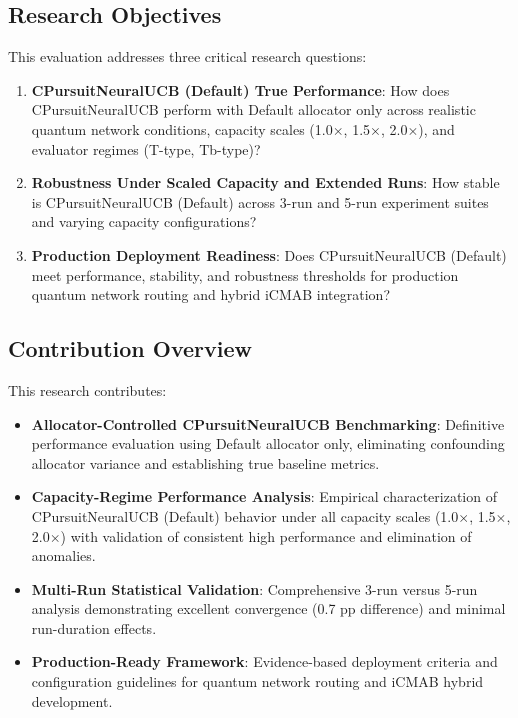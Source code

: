 \documentclass[12pt,a4paper]{article}
\begin{document}
\subsection{Research Objectives}

This evaluation addresses three critical research questions:

\begin{enumerate}
    \item \textbf{CPursuitNeuralUCB (Default) True Performance}: How does CPursuitNeuralUCB perform with Default allocator only across realistic quantum network conditions, capacity scales (1.0$\times$, 1.5$\times$, 2.0$\times$), and evaluator regimes (T-type, Tb-type)?
    
    \item \textbf{Robustness Under Scaled Capacity and Extended Runs}: How stable is CPursuitNeuralUCB (Default) across 3-run and 5-run experiment suites and varying capacity configurations?
    
    \item \textbf{Production Deployment Readiness}: Does CPursuitNeuralUCB (Default) meet performance, stability, and robustness thresholds for production quantum network routing and hybrid iCMAB integration?
\end{enumerate}

\subsection{Contribution Overview}

This research contributes:

\begin{itemize}
    \item \textbf{Allocator-Controlled CPursuitNeuralUCB Benchmarking}: Definitive performance evaluation using Default allocator only, eliminating confounding allocator variance and establishing true baseline metrics.
    
    \item \textbf{Capacity-Regime Performance Analysis}: Empirical characterization of CPursuitNeuralUCB (Default) behavior under all capacity scales (1.0$\times$, 1.5$\times$, 2.0$\times$) with validation of consistent high performance and elimination of anomalies.
    
    \item \textbf{Multi-Run Statistical Validation}: Comprehensive 3-run versus 5-run analysis demonstrating excellent convergence (0.7 pp difference) and minimal run-duration effects.
    
    \item \textbf{Production-Ready Framework}: Evidence-based deployment criteria and configuration guidelines for quantum network routing and iCMAB hybrid development.
\end{itemize}
\end{document}
